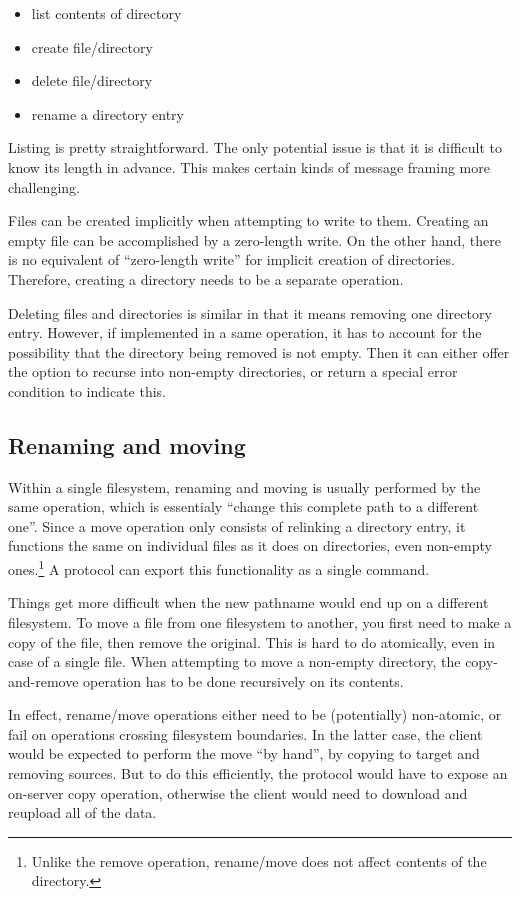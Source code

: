 \begin{itemize}
	\item list contents of directory
	\item create file/directory
	\item delete file/directory
	\item rename a directory entry
\end{itemize}

Listing is pretty straightforward. The only potential issue is that it is difficult to know its length in
advance. This makes certain kinds of message framing more challenging.

Files can be created implicitly when attempting to write to them. Creating an empty file can be accomplished
by a zero-length write. On the other hand, there is no equivalent of ``zero-length write'' for implicit
creation of directories. Therefore, creating a directory needs to be a separate operation.

Deleting files and directories is similar in that it means removing one directory entry. However, if
implemented in a same operation, it has to account for the possibility that the directory being removed is not
empty. Then it can either offer the option to recurse into non-empty directories, or return a special error
condition to indicate this.

\subsection{Renaming and moving}

Within a single filesystem, renaming and moving is usually performed by the same operation, which is
essentialy ``change this complete path to a different one''. Since a move operation only consists of relinking
a directory entry, it functions the same on individual files as it does on directories, even non-empty
ones.\footnote{Unlike the remove operation, rename/move does not affect contents of the directory.} A protocol
can export this functionality as a single command.

Things get more difficult when the new pathname would end up on a different filesystem. To move a file from
one filesystem to another, you first need to make a copy of the file, then remove the original.  This is hard
to do atomically, even in case of a single file. When attempting to move a non-empty directory, the
copy-and-remove operation has to be done recursively on its contents.

In effect, rename/move operations either need to be (potentially) non-atomic, or fail on operations crossing
filesystem boundaries. In the latter case, the client would be expected to perform the move ``by hand'', by
copying to target and removing sources. But to do this efficiently, the protocol would have to expose an
on-server copy operation, otherwise the client would need to download and reupload all of the data.

